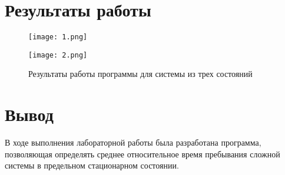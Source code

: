 \section*{Результаты работы}

\begin{figure}[h]
    \begin{minipage}{0.47\textwidth}
        \texttt{[image: 1.png]}
    \end{minipage}
    \hfill
    \begin{minipage}{0.47\textwidth}
        \texttt{[image: 2.png]}
    \end{minipage}
    \caption{Результаты работы программы для системы из трех состояний}
\end{figure}

\clearpage

\section*{Вывод}

В ходе выполнения лабораторной работы была разработана программа, позволяющая
определять среднее относительное время пребывания сложной системы в
предельном стационарном состоянии.

